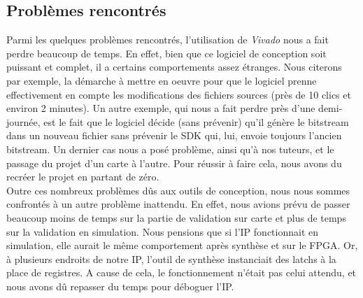 \subsection{Problèmes rencontrés}

Parmi les quelques problèmes rencontrés, l'utilisation de {\em Vivado} nous a fait perdre beaucoup de temps. 
En effet, bien que ce logiciel de conception soit puissant et complet, il a certains comportements assez étranges. 
Nous citerons par exemple, la démarche à mettre en oeuvre pour que le logiciel prenne 
effectivement en compte les modifications des fichiers sources (près de 10 clics et environ 2 minutes). 
Un autre exemple, qui nous a fait perdre près d'une demi-journée, est le fait que le logiciel décide (sans prévenir) 
qu'il génère le bitstream dans un nouveau fichier sans prévenir le SDK qui, lui, envoie toujours l'ancien bitstream. 
Un dernier cas nous a posé problème, ainsi qu'à nos tuteurs, et le passage du projet d'un carte à l'autre. 
Pour réussir à faire cela, nous avons du recréer le projet en partant de zéro.\\

Outre ces nombreux problèmes dûs aux outils de conception, nous nous sommes
confrontés à un autre problème inattendu. 
En effet, nous avions prévu de passer beaucoup moins de temps sur la partie de validation sur 
carte et plus de temps sur la validation en simulation. Nous pensions que si l'IP fonctionnait en simulation, 
elle aurait le même comportement après synthèse et sur le FPGA. 
Or, à plusieurs endroits de notre IP, l'outil de synthèse instanciait des latchs à la place de registres. 
A cause de cela, le fonctionnement n'était pas celui attendu, et nous avons dû repasser du temps pour déboguer l'IP.












